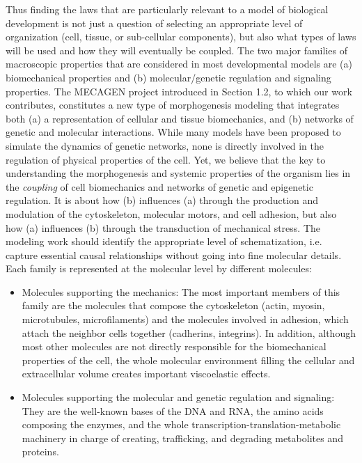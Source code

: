   Thus finding the laws that are particularly relevant to a model of biological development is not just a question of selecting an appropriate level of organization (cell, tissue, or sub-cellular components), but also what types of laws will be used and how they will eventually be coupled. The two major families of macroscopic properties that are considered in most developmental models are (a) biomechanical properties and (b) molecular/genetic regulation and signaling properties. The MECAGEN project introduced in Section 1.2, to which our work contributes, constitutes a new type of morphogenesis modeling that integrates both (a) a representation of cellular and tissue biomechanics, and (b) networks of genetic and molecular interactions. While many models have been proposed to simulate the dynamics of genetic networks, none is directly involved in the regulation of physical properties of the cell. Yet, we believe that the key to understanding the morphogenesis and systemic properties of the organism lies in the \textit{coupling} of cell biomechanics and networks of genetic and epigenetic regulation. It is about how (b) influences (a) through the production and modulation of the cytoskeleton, molecular motors, and cell adhesion, but also how (a) influences (b) through the transduction of mechanical stress. The modeling work should identify the appropriate level of schematization, i.e. capture essential causal relationships without going into fine molecular details. Each family is represented at the molecular level by different molecules: 
\begin{itemize}
	\item    Molecules supporting the mechanics: The most important members of this family are the molecules that compose the cytoskeleton (actin, myosin, microtubules, microfilaments) and the molecules involved in adhesion, which attach the neighbor cells together (cadherins, integrins). In addition, although most other molecules are not directly responsible for the biomechanical properties of the cell, the whole molecular environment filling the cellular and extracellular volume creates important viscoelastic effects.  
	\item    Molecules supporting the molecular and genetic regulation and signaling: They are the well-known bases of the DNA and RNA, the amino acids composing the enzymes, and the whole transcription-translation-metabolic machinery in charge of creating, trafficking, and degrading metabolites and proteins.  
\end{itemize}

